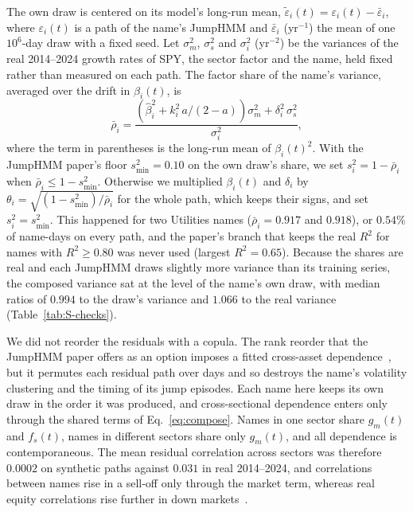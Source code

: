 The own draw is centered on its model's long-run mean, $\tilde\varepsilon_i(t) = \varepsilon_i(t) - \bar\varepsilon_i$,
where $\varepsilon_i(t)$ is a path of the name's JumpHMM and $\bar\varepsilon_i$ (yr$^{-1}$) the mean of one
$10^6$-day draw with a fixed seed. Let $\sigma_m^2$, $\sigma_s^2$ and $\sigma_i^2$ (yr$^{-2}$) be the variances of the
real 2014--2024 growth rates of SPY, the sector factor and the name, held fixed rather than measured on each path. The
factor share of the name's variance, averaged over the drift in $\beta_i(t)$, is
\begin{equation}
  \bar\rho_i = \frac{\left(\hat\beta_i^2 + k_i^2\, a/(2-a)\right)\sigma_m^2 + \delta_i^2\, \sigma_s^2}{\sigma_i^2},
  \label{eq:rho-bar}
\end{equation}
where the term in parentheses is the long-run mean of $\beta_i(t)^2$. With the JumpHMM paper's floor
$s_{\min}^2 = 0.10$ on the own draw's share, we set $s_i^2 = 1 - \bar\rho_i$ when $\bar\rho_i \le 1 - s_{\min}^2$.
Otherwise we multiplied $\beta_i(t)$ and $\delta_i$ by $\theta_i = \sqrt{(1 - s_{\min}^2)/\bar\rho_i}$ for the whole
path, which keeps their signs, and set $s_i^2 = s_{\min}^2$. This happened for two Utilities names
($\bar\rho_i = 0.917$ and $0.918$), or $0.54\%$ of name-days on every path, and the paper's branch that keeps the real
$R^2$ for names with $R^2 \ge 0.80$ was never used (largest $R^2 = 0.65$). Because the shares are real and each
JumpHMM draws slightly more variance than its training series, the composed variance sat at the level of the name's
own draw, with median ratios of $0.994$ to the draw's variance and $1.066$ to the real variance
(Table~\ref{tab:S-checks}).

We did not reorder the residuals with a copula. The rank reorder that the JumpHMM paper offers as an option imposes a
fitted cross-asset dependence~\cite{patton2006,cherubiniLucianoVecchiato2004}, but it permutes each residual path over
days and so destroys the name's volatility clustering and the timing of its jump episodes. Each name here keeps its
own draw in the order it was produced, and cross-sectional dependence enters only through the shared terms of
Eq.~\eqref{eq:compose}. Names in one sector share $g_m(t)$ and $f_s(t)$, names in different sectors share only
$g_m(t)$, and all dependence is contemporaneous. The mean residual correlation across sectors was therefore $0.0002$
on synthetic paths against $0.031$ in real 2014--2024, and correlations between names rise in a sell-off only through
the market term, whereas real equity correlations rise further in down markets~\cite{longinSolnik2001,angChen2002}.

